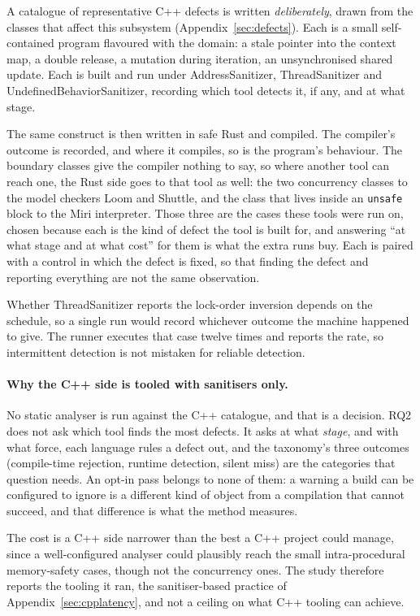 \documentclass[english,oneside,a4paper,censored,csm,software-track-2020]{HYthesisML}
\begin{document}
\begin{appendices}
A catalogue of representative C++ defects is written \emph{deliberately}, drawn from the classes
that affect this subsystem (Appendix~\ref{sec:defects}). Each is a small self-contained
program flavoured with the domain: a stale pointer into the context map, a double release, a
mutation during iteration, an unsynchronised shared update. Each is built and run under
AddressSanitizer, ThreadSanitizer and UndefinedBehaviorSanitizer, recording which tool detects
it, if any, and at what stage.

The same construct is then written in safe Rust and compiled. The compiler's outcome is
recorded, and where it compiles, so is the program's behaviour. The boundary classes give the
compiler nothing to say, so where another tool can reach one, the Rust side goes to that tool as
well: the two concurrency classes to the model checkers Loom and Shuttle, and the class that lives
inside an \texttt{unsafe} block to the Miri interpreter. Those three are the cases these tools were
run on, chosen because each is the kind of defect the tool is built for, and answering ``at what
stage and at what cost'' for them is what the extra runs buy. Each is paired with a control in which
the defect is fixed, so that finding the defect and reporting everything are not the same
observation.

Whether ThreadSanitizer reports the lock-order inversion depends on the schedule, so a single run
would record whichever outcome the machine happened to give. The runner executes that case twelve
times and reports the rate, so intermittent detection is not mistaken for reliable detection.

\paragraph{Why the C++ side is tooled with sanitisers only.}
No static analyser is run against the C++ catalogue, and that is a decision. RQ2 does not ask
which tool finds the most defects. It asks at what \emph{stage}, and with what force, each
language rules a defect out, and the taxonomy's three outcomes (compile-time rejection, runtime
detection, silent miss) are the categories that question needs. An opt-in pass belongs to none
of them: a warning a build can be configured to ignore is a different kind of object from a
compilation that cannot succeed, and that difference is what the method measures.

The cost is a C++ side narrower than the best a C++ project could manage, since a well-configured
analyser could plausibly reach the small intra-procedural memory-safety cases, though not the
concurrency ones. The study therefore reports the tooling it ran, the sanitiser-based practice of
Appendix~\ref{sec:cpplatency}, and not a ceiling on what C++ tooling can achieve.


\end{appendices}
\end{document}
